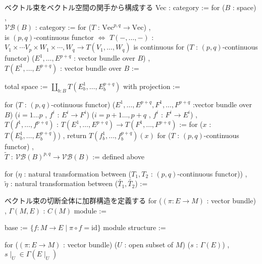 \begin{Definition}
\itemnote
  ベクトル束をベクトル空間の関手から構成する
\itemdefi
  Vec : category := 
\itemdefi
  for (\(B\) : space) ,\\
  \(\mathcal{VB}(B)\) : category := 
\itemdefi
  for (\(T\) : \(\text{Vec}^{p,q} \to \text{Vec}\)) ,\\
  is \((p,q)\)-continuous functor \(\iff\) \(T(- , \ldots , -)\) : \(V_1 \times \cdots V_p \times W_1 \times \cdots , W_q \to T(V_1 , \ldots , W_q)\) is continuous 
\itemdefi
  for (\(T\) : \((p,q)\)-continuous functor) (\(E^1 , \ldots , E^{p + q}\) : vector bundle over \(B\)) ,\\
  \(T(E^1 , \ldots , E^{p + q})\) : vector bundle over \(B\) :=
  \begin{itemize}
    \itemenum total space := \(\coprod_{b : B} T(E^1_b , \ldots , E^{p + q}_b)\) with 
    \itemenum projection := 
  \end{itemize}
\itemdefi
  for (\(T\) : \((p,q)\)-cotinuous functor) (\(E^1 , \ldots , E^{p + q} , F^1 , \ldots , F^{p + q}\) :vector bundle over \(B\)) (\(i = 1 \ldots p\) , \(f^i\) : \(E^i \to F^i\)) (\(i = p + 1 \ldots , p + q\) , \(f^i\) : \(F^i \to E^i\)) ,\\
  \(T(f^1 , \ldots , f^{p + q})\) : \(T(E^1 , \ldots , E^{p + q}) \to T(F^1 , \ldots , F^{p + q})\) := for (\(x\) : \(T(E^1_b , \ldots , E^{p + q}_b)\)) , return \(T(f^1_b , \ldots , f^{p + q}_b)(x)\)
\itemdefi
  for (\(T\) : \((p,q)\)-continuous functor) ,\\
  \(\tilde{T}\) : \(\mathcal{VB}(B)^{p,q} \to \mathcal{VB}(B)\) := defined above
\end{Definition}

\begin{Definition}
\itemdefi
  for (\(\eta\) : natural transformation between (\(T_1 , T_2\) : \((p,q)\)-continuous functor)) ,\\
  \(\tilde{\eta}\) : natural transformation between (\(\tilde{T_1} , \tilde{T_2}\)) :=
\end{Definition}

\begin{Definition}
\itemnote
  ベクトル束の切断全体に加群構造を定義する
\itemdefi
  for (\((\pi : E \to M)\) : vector bundle) , \(\Gamma(M , E)\) : \(C(M)\) module :=
  \begin{itemize}
    \itemenum base := \(\{f : M \to E \mid \pi \circ f = \text{id}\}\)
    \itemenum module structure := 
  \end{itemize}
\itemprop
  for (\((\pi : E \to M)\) : vector bundle) (\(U\) : open subset of \(M\)) (\(s\) : \(\Gamma(E)\)) , \(s \mid_{U} \in \Gamma(E \mid_{U})\)
\end{Definition}

